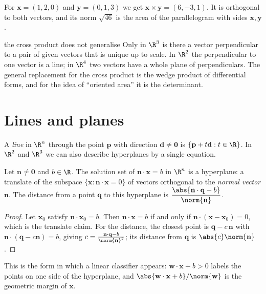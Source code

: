 \begin{example}
For $\mathbf{x}=(1,2,0)$ and $\mathbf{y}=(0,1,3)$ we get $\mathbf{x}\times\mathbf{y}=(6,-3,1)$. It is orthogonal to both vectors, and its norm $\sqrt{46}$ is the area of the parallelogram with sides $\mathbf{x},\mathbf{y}$.
\end{example}

\begin{nuance}{the cross product does not generalise}
Only in $\R^3$ is there a vector perpendicular to a pair of given vectors that is unique up to scale. In $\R^2$ the perpendicular to one vector is a line; in $\R^4$ two vectors have a whole plane of perpendiculars. The general replacement for the cross product is the wedge product of differential forms, and for the idea of ``oriented area'' it is the determinant.
\end{nuance}

\section{Lines and planes}

A \emph{line} in $\R^n$ through the point $\mathbf{p}$ with direction $\mathbf{d}\ne\mathbf{0}$ is $\{\mathbf{p}+t\mathbf{d}:t\in\R\}$. In $\R^2$ and $\R^3$ we can also describe hyperplanes by a single equation.

\begin{proposition}[Hyperplanes]
Let $\mathbf{n}\ne\mathbf{0}$ and $b\in\R$. The solution set of $\mathbf{n}\cdot\mathbf{x}=b$ in $\R^n$ is a hyperplane: a translate of the subspace $\{\mathbf{x}:\mathbf{n}\cdot\mathbf{x}=0\}$ of vectors orthogonal to the \emph{normal vector} $\mathbf{n}$. The distance from a point $\mathbf{q}$ to this hyperplane is $\dfrac{\abs{\mathbf{n}\cdot\mathbf{q}-b}}{\norm{\mathbf{n}}}$.
\end{proposition}

\begin{proof}
Let $\mathbf{x}_0$ satisfy $\mathbf{n}\cdot\mathbf{x}_0=b$. Then $\mathbf{n}\cdot\mathbf{x}=b$ if and only if $\mathbf{n}\cdot(\mathbf{x}-\mathbf{x}_0)=0$, which is the translate claim. For the distance, the closest point is $\mathbf{q}-c\,\mathbf{n}$ with $\mathbf{n}\cdot(\mathbf{q}-c\mathbf{n})=b$, giving $c=\frac{\mathbf{n}\cdot\mathbf{q}-b}{\norm{\mathbf{n}}^2}$; its distance from $\mathbf{q}$ is $\abs{c}\norm{\mathbf{n}}$.
\end{proof}

This is the form in which a linear classifier appears: $\mathbf{w}\cdot\mathbf{x}+b>0$ labels the points on one side of the hyperplane, and $\abs{\mathbf{w}\cdot\mathbf{x}+b}/\norm{\mathbf{w}}$ is the geometric margin of $\mathbf{x}$.


